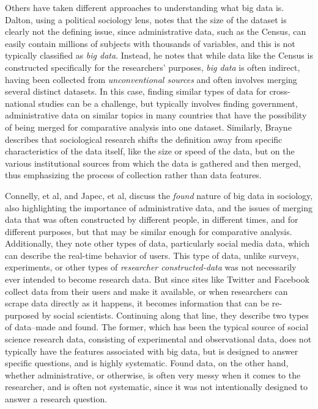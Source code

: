 \documentclass[sigconf]{acmart}
\begin{document}
Others have taken different approaches to understanding what big data is.  Dalton, using a political sociology lens, notes that the size of the dataset is clearly not the defining issue, since administrative data, such as the Census, can easily contain millions of subjects with thousands of variables, and this is not typically classified as {\em big data}.\cite{dalton16}  Instead, he notes that while data like the Census is constructed specifically for the researchers' purposes, {\em big data} is often indirect, having been collected from {\em unconventional sources} and often involves merging several distinct datasets.  In this case, finding similar types of data for cross-national studies can be a challenge, but typically involves finding government, administrative data on similar topics in many countries that have the possibility of being merged for comparative analysis into one dataset.  Similarly, Brayne describes that sociological research shifts the definition away from specific characteristics of the data itself, like the size or speed of the data, but on the various institutional sources from which the data is gathered and then merged, thus emphasizing the process of collection rather than data features.\cite {brayne17}

Connelly, et al, and Japec, et al, discuss the {\em found} nature of big data in sociology, also highlighting the importance of administrative data, and the issues of merging data that was often constructed by different people, in different times, and for different purposes, but that may be similar enough for comparative analysis.\cite {connelly16} \cite {japec15}  Additionally, they note other types of data, particularly social media data, which can describe the real-time behavior of users.  This type of data, unlike surveys, experiments, or other types of {\em researcher constructed-data} was not necessarily ever intended to become research data.  But since sites like Twitter and Facebook collect data from their users and make it available, or when researchers can scrape data directly as it happens, it becomes information that can be re-purposed by social scientists.  Continuing along that line, they describe two types of data--made and found.  The former, which has been the typical source of social science research data, consisting of experimental and observational data, does not typically have the features associated with big data, but is designed to answer specific questions, and is highly systematic.  Found data, on the other hand, whether administrative, or otherwise, is often very messy when it comes to the researcher, and is often not systematic, since it was not intentionally designed to answer a research question.  
\end{document}
